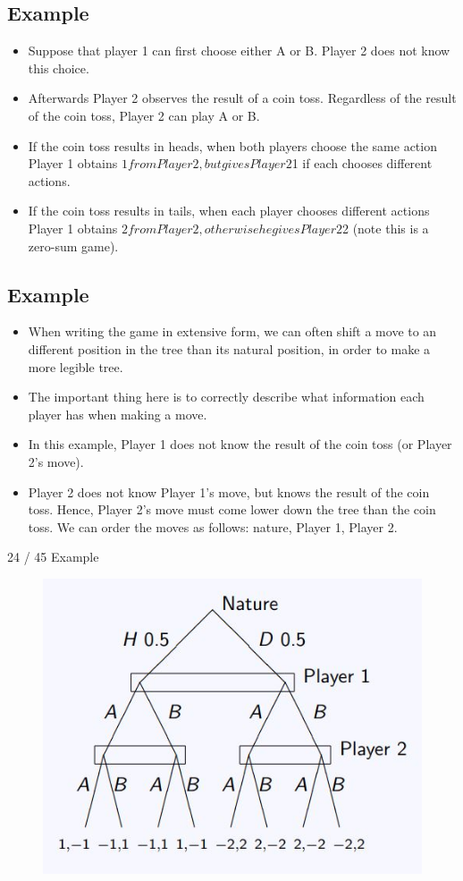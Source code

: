 \documentclass[]{report}
\begin{document}
\subsection{Example}
\begin{itemize}
	\item Suppose that player 1 can first choose either A or B. Player 2 does
	not know this choice.
\item Afterwards Player 2 observes the result of a coin toss. Regardless
	of the result of the coin toss, Player 2 can play A or B.
\item If the coin toss results in heads, when both players choose the
	same action Player 1 obtains $1 from Player 2, but gives Player 2
	$1 if each chooses different actions. 
\item If the coin toss results in tails,
	when each player chooses different actions Player 1 obtains $2
	from Player 2, otherwise he gives Player 2 $2 (note this is a
	zero-sum game).
\end{itemize}


\subsection{Example}
\begin{itemize}
	\item When writing the game in extensive form, we can often shift a
	move to an different position in the tree than its natural position,
	in order to make a more legible tree.
	\item	The important thing here is to correctly describe what information
	each player has when making a move.
	\item In this example, Player 1 does not know the result of the coin toss
	(or Player 2’s move).
	\item	Player 2 does not know Player 1’s move, but knows the result of
	the coin toss. Hence, Player 2’s move must come lower down the
	tree than the coin toss. We can order the moves as follows:
	nature, Player 1, Player 2.
\end{itemize}

24 / 45
Example

\begin{figure}
\centering
\includegraphics[width=0.7\linewidth]{images/DR5-Slide25}
\caption{}
\label{fig:DR5-Slide25}
\end{figure}
\end{document}
